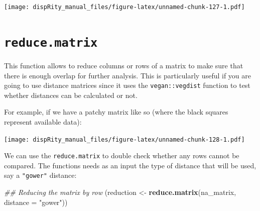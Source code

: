 \documentclass[]{book}
\newenvironment{Shaded}{\begin{snugshade}}{\end{snugshade}}
\newcommand{\CommentTok}[1]{\textcolor[rgb]{0.56,0.35,0.01}{\textit{#1}}}
\newcommand{\DataTypeTok}[1]{\textcolor[rgb]{0.13,0.29,0.53}{#1}}
\newcommand{\DecValTok}[1]{\textcolor[rgb]{0.00,0.00,0.81}{#1}}
\newcommand{\KeywordTok}[1]{\textcolor[rgb]{0.13,0.29,0.53}{\textbf{#1}}}
\newcommand{\NormalTok}[1]{#1}
\newcommand{\OperatorTok}[1]{\textcolor[rgb]{0.81,0.36,0.00}{\textbf{#1}}}
\newcommand{\OtherTok}[1]{\textcolor[rgb]{0.56,0.35,0.01}{#1}}
\newcommand{\StringTok}[1]{\textcolor[rgb]{0.31,0.60,0.02}{#1}}
\begin{document}
\texttt{[image: dispRity\_manual\_files/figure-latex/unnamed-chunk-127-1.pdf]}

\hypertarget{reduce.matrix}{%
\section{\texorpdfstring{\texttt{reduce.matrix}}{reduce.matrix}}\label{reduce.matrix}}

This function allows to reduce columns or rows of a matrix to make sure that there is enough overlap for further analysis.
This is particularly useful if you are going to use distance matrices since it uses the \texttt{vegan::vegdist} function to test whether distances can be calculated or not.

For example, if we have a patchy matrix like so (where the black squares represent available data):

\begin{Shaded}
\end{Shaded}

\texttt{[image: dispRity\_manual\_files/figure-latex/unnamed-chunk-128-1.pdf]}

We can use the \texttt{reduce.matrix} to double check whether any rows cannot be compared.
The functions needs as an input the type of distance that will be used, say a \texttt{"gower"} distance:

\begin{Shaded}
\begin{Highlighting}[]
\CommentTok{## Reducing the matrix by row}
\NormalTok{(reduction <-}\StringTok{ }\KeywordTok{reduce.matrix}\NormalTok{(na_matrix, }\DataTypeTok{distance =} \StringTok{"gower"}\NormalTok{))}
\end{Highlighting}
\end{Shaded}
\end{document}
